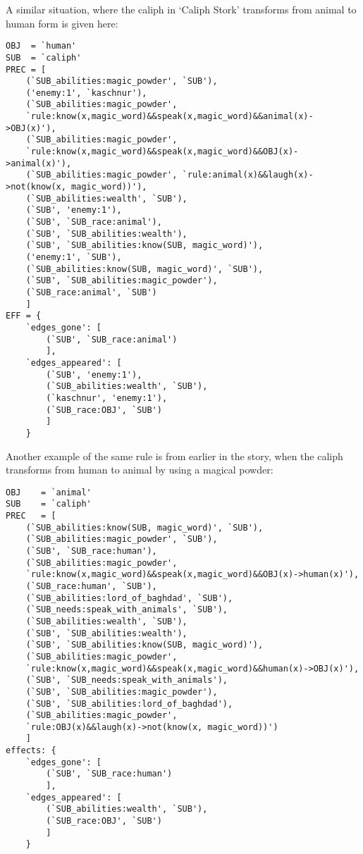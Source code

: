 A similar situation, where the caliph in `Caliph Stork' transforms from animal 
to human form is given here:

\begin{verbatim}
OBJ  = `human'
SUB  = `caliph'
PREC = [
    (`SUB_abilities:magic_powder', `SUB'),
    ('enemy:1', `kaschnur'),
    (`SUB_abilities:magic_powder',
    `rule:know(x,magic_word)&&speak(x,magic_word)&&animal(x)->OBJ(x)'),
    (`SUB_abilities:magic_powder',
    `rule:know(x,magic_word)&&speak(x,magic_word)&&OBJ(x)->animal(x)'),
    (`SUB_abilities:magic_powder', `rule:animal(x)&&laugh(x)->not(know(x, magic_word))'),
    (`SUB_abilities:wealth', `SUB'), 
    (`SUB', 'enemy:1'), 
    (`SUB', `SUB_race:animal'),
    (`SUB', `SUB_abilities:wealth'),
    (`SUB', `SUB_abilities:know(SUB, magic_word)'),
    ('enemy:1', `SUB'), 
    (`SUB_abilities:know(SUB, magic_word)', `SUB'),
    (`SUB', `SUB_abilities:magic_powder'), 
    (`SUB_race:animal', `SUB')
    ]
EFF = {
    `edges_gone': [
        (`SUB', `SUB_race:animal')
        ],
    `edges_appeared': [
        (`SUB', 'enemy:1'),
        (`SUB_abilities:wealth', `SUB'),
        (`kaschnur', 'enemy:1'),
        (`SUB_race:OBJ', `SUB')
        ]
    }
\end{verbatim}

Another example of the same rule is from earlier in the story, when the caliph
transforms from human to animal by using a magical powder:

\begin{verbatim}
OBJ    = `animal'
SUB    = `caliph'
PREC   = [
    (`SUB_abilities:know(SUB, magic_word)', `SUB'),
    (`SUB_abilities:magic_powder', `SUB'),
    (`SUB', `SUB_race:human'),
    (`SUB_abilities:magic_powder', 
    `rule:know(x,magic_word)&&speak(x,magic_word)&&OBJ(x)->human(x)'), 
    (`SUB_race:human', `SUB'),
    (`SUB_abilities:lord_of_baghdad', `SUB'),
    (`SUB_needs:speak_with_animals', `SUB'),
    (`SUB_abilities:wealth', `SUB'),
    (`SUB', `SUB_abilities:wealth'),
    (`SUB', `SUB_abilities:know(SUB, magic_word)'),
    (`SUB_abilities:magic_powder',
    `rule:know(x,magic_word)&&speak(x,magic_word)&&human(x)->OBJ(x)'),
    (`SUB', `SUB_needs:speak_with_animals'),
    (`SUB', `SUB_abilities:magic_powder'),
    (`SUB', `SUB_abilities:lord_of_baghdad'),
    (`SUB_abilities:magic_powder', 
    `rule:OBJ(x)&&laugh(x)->not(know(x, magic_word))')
    ]
effects: {
    `edges_gone': [
        (`SUB', `SUB_race:human')
        ],
    `edges_appeared': [
        (`SUB_abilities:wealth', `SUB'),
        (`SUB_race:OBJ', `SUB')
        ]
    }
\end{verbatim}

